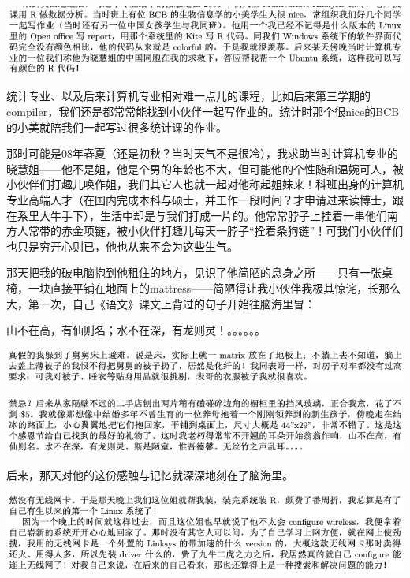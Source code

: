 \documentclass[9pt, b5paper]{article}
\begin{document}
\begin{center}
\includegraphics[width=.9\linewidth]{./pic/backups_plans_20210422_090457.png}
\end{center}

统计专业、以及后来计算机专业相对难一点儿的课程，比如后来第三学期的compiler，我们还是都常常能找到小伙伴一起写作业的。统计时那个很nice的BCB的小美就陪我们一起写过很多统计课的作业。

那时可能是08年春夏（还是初秋？当时天气不是很冷），我求助当时计算机专业的晓慧姐——他不是姐，他是个男的年龄也不大，但可能他的个性随和温婉可人，被小伙伴们打趣儿唤作姐，我们其它人也就一起对他称起姐妹来！科班出身的计算机专业高端人才（在国内完成本科与硕士，并工作一段时间？才申请过来读博士，跟在系里大牛手下），生活中却是与我们打成一片的。他常常脖子上挂着一串他们南方人常带的赤金项链，被小伙伴打趣儿每天一脖子“拴着条狗链”！可我们小伙伴们也只是穷开心则已，他也从来不会为这些生气。

那天把我的破电脑抱到他租住的地方，见识了他简陋的息身之所——只有一张桌椅，一块直接平铺在地面上的mattress——简陋得让我小伙伴我极其惊诧，长那么大，第一次，自己《语文》课文上背过的句子开始往脑海里冒：

山不在高，有仙则名；水不在深，有龙则灵！。。。。。。

\begin{center}
\includegraphics[width=.9\linewidth]{./pic/backups_plans_20210422_092547.png}
\end{center}

\begin{center}
\includegraphics[width=.9\linewidth]{./pic/backups_plans_20210422_092432.png}
\end{center}

后来，那天对他的这份感触与记忆就深深地刻在了脑海里。 

\begin{center}
\includegraphics[width=.9\linewidth]{./pic/backups_plans_20210425_104206.png}
\end{center}
\end{document}
